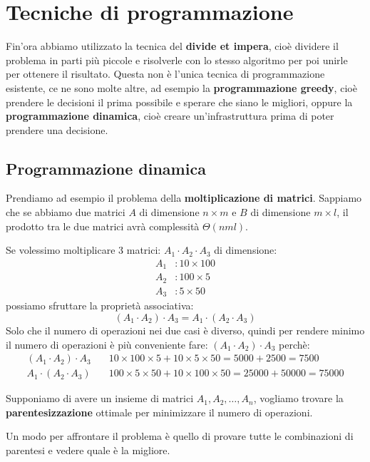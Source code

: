 \documentclass[a4paper]{article}
\begin{document}
\section{Tecniche di programmazione}
Fin'ora abbiamo utilizzato la tecnica del \textbf{divide et impera}, cioè dividere
il problema in parti più piccole e risolverle con lo stesso algoritmo per poi unirle
per ottenere il risultato. Questa non è l'unica tecnica di programmazione esistente,
ce ne sono molte altre, ad esempio la \textbf{programmazione greedy}, cioè prendere
le decisioni il prima possibile e sperare che siano le migliori, oppure la
\textbf{programmazione dinamica}, cioè creare un'infrastruttura prima di poter 
prendere una decisione.

\subsection{Programmazione dinamica}
Prendiamo ad esempio il problema della \textbf{moltiplicazione di matrici}.
Sappiamo che se abbiamo due matrici \( A \) di dimensione \( n \times m \) e \( B \)
di dimensione \( m \times l \), il prodotto tra le due matrici avrà complessità
\( \Theta(nml) \).

Se volessimo moltiplicare 3 matrici: \( A_1 \cdot A_2 \cdot A_3 \) di dimensione:
\[
\begin{aligned}
  A_1 & : 10 \times 100\\
  A_2 & : 100 \times 5\\
  A_3 & : 5 \times 50
\end{aligned}
\] 
possiamo sfruttare la proprietà associativa:
\[
  (A_1 \cdot A_2) \cdot A_3 = A_1 \cdot (A_2 \cdot A_3)
\] 
Solo che il numero di operazioni nei due casi è diverso, quindi per rendere minimo
il numero di operazioni è più conveniente fare: \( (A_1 \cdot A_2) \cdot A_3 \) perchè:
\[
\begin{aligned}
  (A_1 \cdot A_2) \cdot A_3 &\quad 10 \times 100 \times 5 + 10 \times 5 \times 50 = 5000 + 2500 = 7500\\
  A_1 \cdot (A_2 \cdot A_3) &\quad 100 \times 5 \times 50 + 10 \times 100 \times 50 = 25000 + 50000 = 75000
\end{aligned}
\] 

\vspace{1em}
\noindent
Supponiamo di avere un insieme di matrici \( A_1, A_2, \ldots, A_n \), vogliamo trovare
la \textbf{parentesizzazione} ottimale per minimizzare il numero di operazioni.

\vspace{1em}
\noindent
Un modo per affrontare il problema è quello di provare tutte le combinazioni
di parentesi e vedere quale è la migliore.
\end{document}

